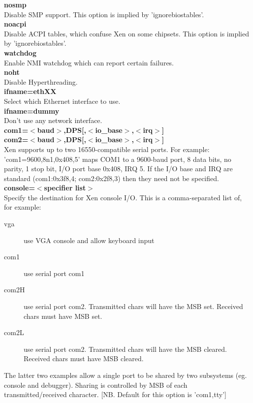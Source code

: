 \documentclass[11pt,twoside,final,openright]{xenstyle}
\begin{document}
{\bf nosmp } \\
 Disable SMP support.
 This option is implied by 'ignorebiostables'. \\

{\bf noacpi } \\
 Disable ACPI tables, which confuse Xen on some chipsets.
 This option is implied by 'ignorebiostables'. \\

{\bf watchdog } \\
 Enable NMI watchdog which can report certain failures. \\

{\bf noht } \\
 Disable Hyperthreading. \\

{\bf ifname=ethXX }\\ 
 Select which Ethernet interface to use. \\

{\bf ifname=dummy } \\
 Don't use any network interface. \\

{\bf com1=$<$baud$>$,DPS[,$<$io\_base$>$,$<$irq$>$] \\
 com2=$<$baud$>$,DPS[,$<$io\_base$>$,$<$irq$>$] } \\
 Xen supports up to two 16550-compatible serial ports.
 For example: 'com1=9600,8n1,0x408,5' maps COM1 to a
 9600-baud port, 8 data bits, no parity, 1 stop bit,
 I/O port base 0x408, IRQ 5.
 If the I/O base and IRQ are standard (com1:0x3f8,4;
 com2:0x2f8,3) then they need not be specified. \\

{\bf console=$<$specifier list$>$ } \\
 Specify the destination for Xen console I/O.
 This is a comma-separated list of, for example:
\begin{description}
 \item[vga]  use VGA console and allow keyboard input
 \item[com1] use serial port com1
 \item[com2H] use serial port com2. Transmitted chars will
   have the MSB set. Received chars must have
   MSB set.
 \item[com2L] use serial port com2. Transmitted chars will
   have the MSB cleared. Received chars must
   have MSB cleared.
\end{description}
 The latter two examples allow a single port to be
 shared by two subsystems (eg. console and
 debugger). Sharing is controlled by MSB of each
 transmitted/received character.
 [NB. Default for this option is 'com1,tty'] \\
\end{document}
